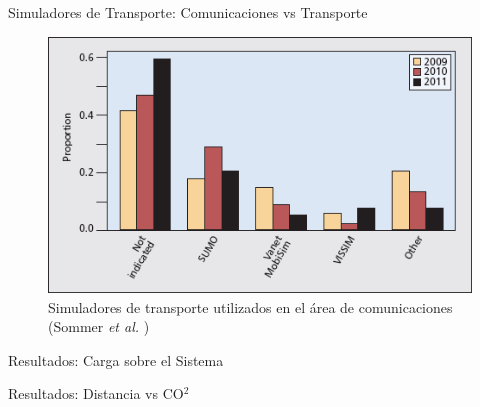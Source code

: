 \documentclass[aspectratio=169]{beamer}
\begin{document}
\begin{frame}{Simuladores de Transporte: Comunicaciones vs Transporte}
\begin{figure}[p]
\centering
\includegraphics[height=.7\textheight]{figuras/trafficsims_comp}
\caption{Simuladores de transporte utilizados en el área de comunicaciones\\(Sommer \emph{et al.} \autocite{sommer_dressler2})}
\label{fig:trafficsimscomp}
\end{figure}
\end{frame}

\begin{frame}{Resultados: Carga sobre el Sistema}
\begin{figure}
    \centering
    \renewcommand{\figurewidth}{\linewidth}
    \renewcommand{\figureheight}{180}
    
\end{figure}
\end{frame}

\begin{frame}{Resultados: Distancia vs CO$^2$}
\begin{figure}
    \centering
    \renewcommand{\figurewidth}{\linewidth}
    \renewcommand{\figureheight}{165}
    
\end{figure}
\end{frame}
\end{document}

